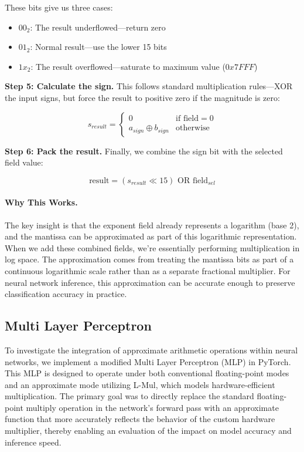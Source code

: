 \documentclass[12pt,letterpaper]{article}
\begin{document}
These bits give us three cases:

\begin{itemize}
    \item $00_2$: The result underflowed—return zero
    \item $01_2$: Normal result—use the lower 15 bits
    \item $1x_2$: The result overflowed—saturate to maximum value ($0x7FFF$)
\end{itemize}

\textbf{Step 5: Calculate the sign.} This follows standard multiplication rules—XOR the input signs, but force the result to positive zero if the magnitude is zero:

\begin{equation}
s_{result} = \begin{cases}
0 & \text{if field} = 0 \\
a_{sign} \oplus b_{sign} & \text{otherwise}
\end{cases}
\end{equation}

\textbf{Step 6: Pack the result.} Finally, we combine the sign bit with the selected field value:

\begin{equation}
\text{result} = (s_{result} \ll 15) \text{ OR } \text{field}_{sel}
\end{equation}

\paragraph{Why This Works.}

The key insight is that the exponent field already represents a logarithm (base 2), and the mantissa can be approximated as part of this logarithmic representation. When we add these combined fields, we're essentially performing multiplication in log space. The approximation comes from treating the mantissa bits as part of a continuous logarithmic scale rather than as a separate fractional multiplier. For neural network inference, this approximation can be accurate enough to preserve classification accuracy in practice.

\subsection{Multi Layer Perceptron}

To investigate the integration of approximate arithmetic operations within neural networks, we implement a modified Multi Layer Perceptron (MLP) in PyTorch. This MLP is designed to operate under both conventional floating-point modes and an approximate mode utilizing L-Mul, which models hardware-efficient multiplication. The primary goal was to directly replace the standard floating-point multiply operation in the network's forward pass with an approximate function that more accurately reflects the behavior of the custom hardware multiplier, thereby enabling an evaluation of the impact on model accuracy and inference speed.
\end{document}
